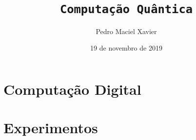 \documentclass[14pt]{beamer}
\title{\texttt{Computação Quântica}}
\institute{IM-UFRJ}
\date{19 de novembro de 2019}
\author{Pedro Maciel Xavier}
\begin{document}
	\frame{\titlepage}
	

	\section{Computação Digital}	
	\frame%
	{
				
	}
	
	\frame%
	{
				
	}
	
	\section{Experimentos}
	\frame%
	{
				
	}
	
	\frame%
	{
				
	}

	\frame%
	{
				
	}
	
	\frame%
	{
				
	}
	
	\frame%
	{
				
	}
	
	\frame%
	{
				
	}

	\frame%
	{
				
	}
	
	\frame%
	{
				
	}
	
	\frame%
	{
				
	}
	
	\frame%
	{
				
	}
\end{document}
